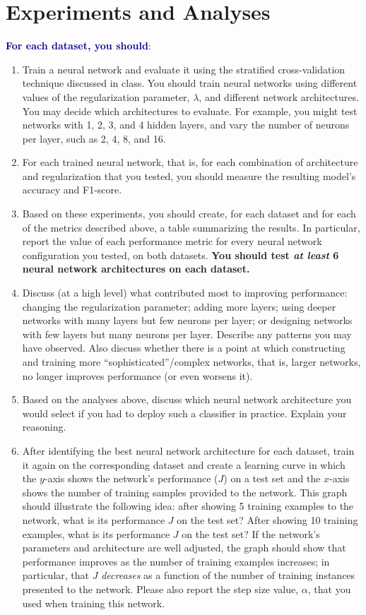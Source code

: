 \documentclass{article}
\begin{document}
\section{Experiments and Analyses}
\vspace{0.3cm}
\textcolor{darkblue}{\large \textbf{For each dataset, you should}}:
\vspace{0.25cm}


\begin{enumerate}
    \item Train a neural network and evaluate it using the stratified cross-validation technique discussed in class. You should train neural networks using different values of the regularization parameter, $\lambda$, and different network architectures. You may decide which architectures to evaluate. For example, you might test networks with 1, 2, 3, and 4 hidden layers, and vary the number of neurons per layer, such as 2, 4, 8, and 16.
    \item For each trained neural network, that is, for each combination of architecture and regularization that you tested, you should measure the resulting model's accuracy and F1-score.
    \item Based on these experiments, you should create, for each dataset and for each of the metrics described above, a table summarizing the results. In particular, report the value of each performance metric for every neural network configuration you tested, on both datasets. \textbf{You should test \textit{at least} 6 neural network architectures on each dataset.}
    \item Discuss (at a high level) what contributed most to improving performance: changing the regularization parameter; adding more layers; using deeper networks with many layers but few neurons per layer; or designing networks with few layers but many neurons per layer. Describe any patterns you may have observed. Also discuss whether there is a point at which constructing and training more ``sophisticated''/complex networks, that is, larger networks, no longer improves performance (or even worsens it).
    \item Based on the analyses above, discuss which neural network architecture you would select if you had to deploy such a classifier in practice. Explain your reasoning.
    \item After identifying the best neural network architecture for each dataset, train it again on the corresponding dataset and create a learning curve in which the $y$-axis shows the network's performance ($J$) on a test set and the $x$-axis shows the number of training samples provided to the network. This graph should illustrate the following idea: after showing 5 training examples to the network, what is its performance $J$ on the test set? After showing 10 training examples, what is its performance $J$ on the test set? If the network’s parameters and architecture are well adjusted, the graph should show that performance improves as the number of training examples increases; in particular, that $J$ \textit{decreases} as a function of the number of training instances presented to the network. Please also report the step size value, $\alpha$, that you used when training this network.


\end{enumerate}
\end{document}
